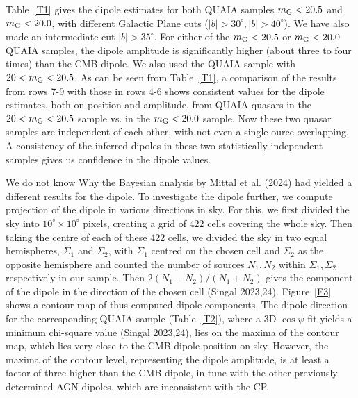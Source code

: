 \documentclass[fleqn,usenatbib]{mnras}
\begin{document}
Table~\ref{T1} gives the dipole estimates for both QUAIA samples $m_{\rm G}< 20.5$ and $m_{\rm G}< 20.0$, with different Galactic Plane cuts ($|b|>30^\circ, |b|>40^\circ$). We have also made an intermediate cut $|b|>35^\circ$. For either of the $m_{\rm G}< 20.5$ or $m_{\rm G}< 20.0$ QUAIA samples, the dipole amplitude is significantly higher (about three to four times) than the CMB dipole. We also used the QUAIA   sample with $20<m_{\rm G}<20.5$. As can be seen from Table~\ref{T1}, a comparison of the results from rows 7-9 with those in rows 4-6 shows consistent values for the dipole estimates, both on position and amplitude, from QUAIA quasars in the $20<m_{\rm G}<20.5$ sample vs. in the $m_{\rm G}<20.0$ sample. Now these two quasar samples are independent of each other, with not even a single ource overlapping. A consistency of the inferred dipoles in these two statistically-independent samples gives us confidence in the dipole values. 

We do not know Why the Bayesian analysis by Mittal et al. (2024) had yielded a different results for the dipole. To investigate the dipole further, we compute projection of the dipole in various directions in sky. For this, we first divided the sky into $10^\circ \times 10^\circ$ pixels, creating a grid of $422$ cells covering the whole sky. 
Then taking the centre of each of these 422 cells, we divided the sky in two equal hemispheres, $\Sigma_1$ and $\Sigma_2$, with $\Sigma_1$ centred on the chosen cell and $\Sigma_2$ as the opposite hemisphere and counted the number of sources $N_1, N_2$ within $\Sigma_1, \Sigma_2$ respectively in our sample. Then $2(N_1-N_2)/(N_1+N_2)$ gives the component of the dipole in the direction of the chosen cell (Singal 2023,24). Figure~\ref{F3} shows a contour map of thus computed dipole components. The dipole direction for the corresponding QUAIA sample (Table~\ref{T2}), where a 3D $\cos\psi$ fit yields a minimum chi-square value (Singal 2023,24), lies on the maxima of the contour map, which lies very close to the CMB dipole position on sky. However, the maxima of the contour level, representing the dipole amplitude, is at least a factor of three higher than the CMB dipole, in tune with the other previously determined  AGN dipoles, which are inconsistent with the CP. 
\end{document}

